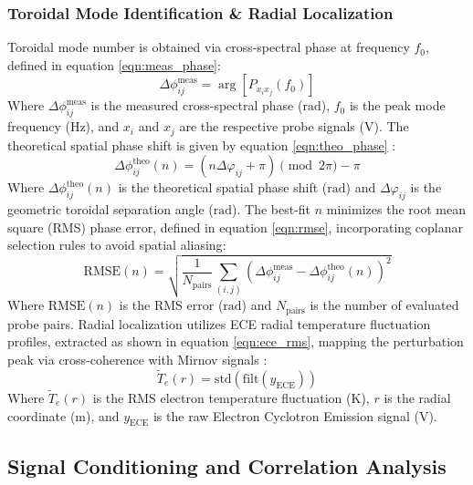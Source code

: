 \subsubsection{Toroidal Mode Identification \& Radial Localization}
Toroidal mode number is obtained via cross-spectral phase at frequency $f_0$, defined in equation \ref{eqn:meas_phase}\cite{bendat2010random,Smith1971}:
\begin{equation}
\label{eqn:meas_phase}
\Delta\phi_{ij}^{\text{meas}} = \arg\left[P_{x_i x_j}(f_0)\right]
\end{equation}
Where $\Delta\phi_{ij}^{\text{meas}}$ is the measured cross-spectral phase ($\text{rad}$), $f_0$ is the peak mode frequency ($\text{Hz}$), and $x_i$ and $x_j$ are the respective probe signals ($\text{V}$). The theoretical spatial phase shift is given by equation \ref{eqn:theo_phase} \cite{strait2006,Seo2019TheEO}:
\begin{equation}
\label{eqn:theo_phase}
\Delta\phi_{ij}^{\text{theo}}(n) = (n \Delta\varphi_{ij} + \pi) \pmod{2\pi} - \pi
\end{equation}
Where $\Delta\phi_{ij}^{\text{theo}}(n)$ is the theoretical spatial phase shift ($\text{rad}$) and $\Delta\varphi_{ij}$ is the geometric toroidal separation angle ($\text{rad}$). The best-fit $n$ minimizes the root mean square (RMS) phase error, defined in equation \ref{eqn:rmse}, incorporating coplanar selection rules to avoid spatial aliasing\cite{schittenhelm1997analysis}:
\begin{equation}
\label{eqn:rmse}
\text{RMSE}(n) = \sqrt{\frac{1}{N_{\text{pairs}}} \sum_{(i,j)} \left(\Delta\phi_{ij}^{\text{meas}} - \Delta\phi_{ij}^{\text{theo}}(n)\right)^2}
\end{equation}
Where $\text{RMSE}(n)$ is the RMS error ($\text{rad}$) and $N_{\text{pairs}}$ is the number of evaluated probe pairs. Radial localization utilizes ECE radial temperature fluctuation profiles, extracted as shown in equation \ref{eqn:ece_rms}, mapping the perturbation peak via cross-coherence with Mirnov signals \cite{luo2020measurement}:
\begin{equation}
\label{eqn:ece_rms}
\tilde{T}_e(r) = \text{std}(\text{filt}(y_{\text{ECE}}))
\end{equation}
Where $\tilde{T}_e(r)$ is the RMS electron temperature fluctuation ($\text{K}$), $r$ is the radial coordinate ($\text{m}$), and $y_{\text{ECE}}$ is the raw Electron Cyclotron Emission signal ($\text{V}$).

\subsection{Signal Conditioning and Correlation Analysis}

